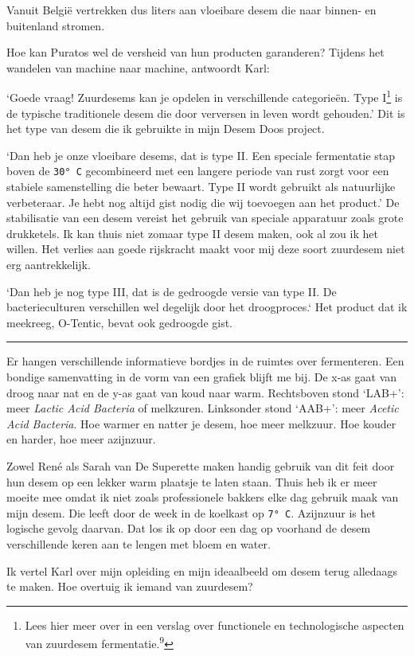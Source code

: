 \documentclass[
  11pt,
  dutch,
]{memoir}
\begin{document}
Vanuit België vertrekken dus liters aan vloeibare desem die naar binnen-
en buitenland stromen.

Hoe kan Puratos wel de versheid van hun producten garanderen? Tijdens
het wandelen van machine naar machine, antwoordt Karl:

`Goede vraag! Zuurdesems kan je opdelen in verschillende categorieën.
Type I\footnote{Lees hier meer over in een verslag over functionele en
  technologische aspecten van zuurdesem fermentatie.\textsuperscript{9}}
is de typische traditionele desem die door verversen in leven wordt
gehouden.' Dit is het type van desem die ik gebruikte in mijn Desem Doos
project.

`Dan heb je onze vloeibare desems, dat is type II. Een speciale
fermentatie stap boven de \texttt{30°\ C} gecombineerd met een langere
periode van rust zorgt voor een stabiele samenstelling die beter
bewaart. Type II wordt gebruikt als natuurlijke verbeteraar. Je hebt nog
altijd gist nodig die wij toevoegen aan het product.' De stabilisatie
van een desem vereist het gebruik van speciale apparatuur zoals grote
drukketels. Ik kan thuis niet zomaar type II desem maken, ook al zou ik
het willen. Het verlies aan goede rijskracht maakt voor mij deze soort
zuurdesem niet erg aantrekkelijk.

`Dan heb je nog type III, dat is de gedroogde versie van type II. De
bacterieculturen verschillen wel degelijk door het droogproces.` Het
product dat ik meekreeg, O-Tentic, bevat ook gedroogde gist.

\pfbreak

Er hangen verschillende informatieve bordjes in de ruimtes over
fermenteren. Een bondige samenvatting in de vorm van een grafiek blijft
me bij. De x-as gaat van droog naar nat en de y-as gaat van koud naar
warm. Rechtsboven stond `LAB+': meer \emph{Lactic Acid Bacteria} of
melkzuren. Linksonder stond `AAB+': meer \emph{Acetic Acid Bacteria}.
Hoe warmer en natter je desem, hoe meer melkzuur. Hoe kouder en harder,
hoe meer azijnzuur.

Zowel René als Sarah van De Superette maken handig gebruik van dit feit
door hun desem op een lekker warm plaatsje te laten staan. Thuis heb ik
er meer moeite mee omdat ik niet zoals professionele bakkers elke dag
gebruik maak van mijn desem. Die leeft door de week in de koelkast op
\texttt{7°\ C}. Azijnzuur is het logische gevolg daarvan. Dat los ik op
door een dag op voorhand de desem verschillende keren aan te lengen met
bloem en water.

Ik vertel Karl over mijn opleiding en mijn ideaalbeeld om desem terug
alledaags te maken. Hoe overtuig ik iemand van zuurdesem?
\end{document}
